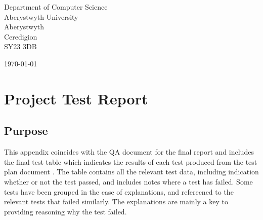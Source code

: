\documentclass[a4paper]{article}
\begin{document}
\begin{center}
\begin{minipage}{0.8\textwidth}
\begin{flushleft} \large
Department of Computer Science\\
Aberystwyth University\\
Aberystwyth\\
Ceredigion\\
SY23 3DB\\
\end{flushleft}
\end{minipage}
\vfill
{\large \today}
\end{center}
\clearpage
\setlength\parindent{0pt}


\tableofcontents
\clearpage

\section{Project Test Report}
\subsection{Purpose}
This appendix coincides with the QA document for the final report\cite{Software Engineering Group Projects. QA Final Report.} and includes the final test table which indicates the results of each test produced from the test plan document \cite{Test Plan}. The table contains all the relevant test data, including indication whether or not the test passed, and includes notes where a test has failed. Some tests have been grouped in the case of explanations, and referecned to the relevant tests that failed similarly. The explanations are mainly a key to providing reasoning why the test failed.
\clearpage
\end{document}
